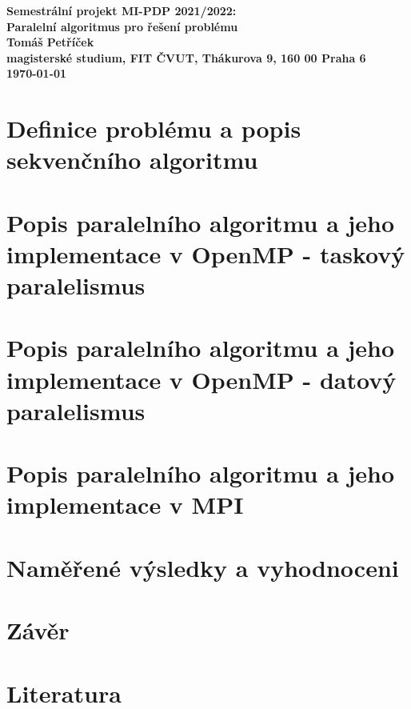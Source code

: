 \documentclass{article}
\begin{document}
\begin{center}
\bf Semestrální projekt MI-PDP 2021/2022:\\[5mm]
    Paralelní algoritmus pro řešení problému\\[5mm] 
       Tomáš Petříček\\[2mm]
magisterské studium, FIT ČVUT, Thákurova 9, 160 00 Praha 6\\[2mm]
\today
\end{center}

\section{Definice problému a popis sekvenčního algoritmu}

\section{Popis paralelního algoritmu a jeho implementace v OpenMP - taskový paralelismus}

\section{Popis paralelního algoritmu a jeho implementace v OpenMP - datový paralelismus}

\section{Popis paralelního algoritmu a jeho implementace v MPI}

\section{Naměřené výsledky a vyhodnoceni}

\section{Závěr}

\section{Literatura}
\end{document}
